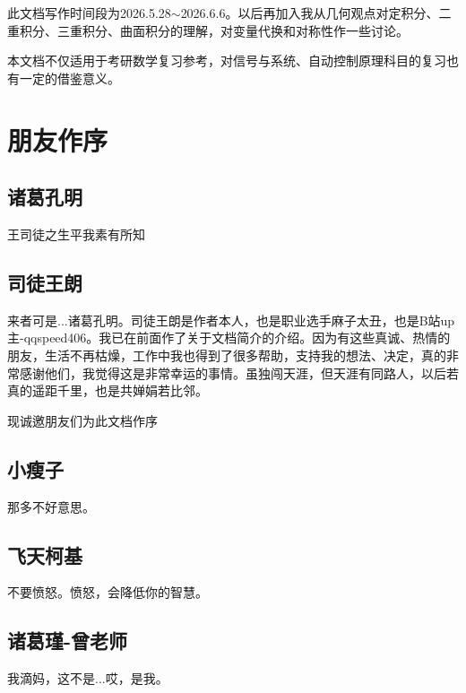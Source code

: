\documentclass[12pt]{report}
\begin{document}
此文档写作时间段为2026.5.28$\sim$2026.6.6。以后再加入我从几何观点对定积分、二重积分、三重积分、曲面积分的理解，对变量代换和对称性作一些讨论。

本文档不仅适用于考研数学复习参考，对信号与系统、自动控制原理科目的复习也有一定的借鉴意义。

 \chapter*{朋友作序}
 \section*{\textbullet \hspace{0.5em}诸葛孔明}
 
 \mfMicroscope 王司徒之生平我素有所知
 
 \section*{\textbullet \hspace{0.5em}司徒王朗}
 
 来者可是...诸葛孔明。司徒王朗是作者本人，也是职业选手麻子太丑，也是B站up主-qqspeed406。我已在前面作了关于文档简介的介绍。因为有这些真诚、热情的朋友，生活不再枯燥，工作中我也得到了很多帮助，支持我的想法、决定，真的非常感谢他们，我觉得这是非常幸运的事情。虽独闯天涯，但天涯有同路人，以后若真的遥距千里，也是共婵娟若比邻。
 
 现诚邀朋友们为此文档作序
 
  \section*{\textbullet \hspace{0.5em}小瘦子}

 那多不好意思。  
   
 \section*{\textbullet \hspace{0.5em}飞天柯基} 
   
 不要愤怒。愤怒，会降低你的智慧。
 
 \section*{诸葛瑾-曾老师}
 
 我滴妈，这不是...哎，是我。
 
\end{document}
